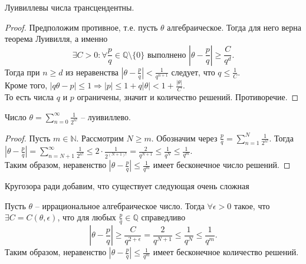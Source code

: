 \begin{proposition} \label{l9_prp}
	Луивиллевы числа трансцендентны.
\end{proposition}
\begin{proof}
	Предположим противное, т.е. пусть $\theta$ алгебраическое. Тогда для него верна теорема Луивилля, а именно
	$$\exists C > 0:  \forall  \frac{p}{q} \in \mathbb{Q} \setminus \lbrace 0 \rbrace \text{ выполнено }  \left|\theta - \frac{p}{q}\right| \geq \frac{C}{q^d}.$$ 
	Тогда при $n \geq d$ из неравенства $\displaystyle \left|\theta - \frac{p}{q}\right| < \frac{1}{q^{n + 1}}$ следует, что $\displaystyle q \leq \frac{1}{C}$.\\
	Кроме того, $\displaystyle \left|q \theta - p\right| \leq 1 \Rightarrow |p| \leq 1 + q|\theta| < 1 + \frac{|\theta|}{C}.$\\
	То есть числа $q$ и $p$ ограничены, значит и количество решений. Противоречие.
\end{proof}

\begin{example}
	Число $\displaystyle \theta = \sum_{n = 0}^{\infty} \frac{1}{2^{n!}}$ -- луивиллево.
\end{example}
\begin{proof}
	Пусть $m \in \mathbb{N}$. Рассмотрим $N \geq m$. Обозначим через $\displaystyle \frac{p}{q} = \sum_{n = 1}^{N} \frac{1}{2^{n!}}$. Тогда $\displaystyle \left| \theta - \frac{p}{q} \right| = \sum_{n = N + 1}^{\infty} \frac{1}{2^{n!}} \leq 2 \cdot \frac{1}{2^{(N+1)!}} = \frac{2}{q^{N + 1}} \leq \frac{1}{q^N} \leq \frac{1}{q^m}$.\\
	Таким образом, неравенство $\displaystyle \left| \theta - \frac{p}{q} \right| \leq \frac{1}{q^m}$ имеет бесконечное число решений.
\end{proof}

Кругозора ради добавим, что существует следующая очень сложная

\begin{theorem}
	Пусть $\theta$ -- иррациональное алгебраическое число. Тогда $\forall \epsilon > 0$ такое, что $\exists C = C(\theta, \epsilon)$, что для любых $\frac{p}{q} \in \mathbb{Q}$ справедливо 
	$$\left|\theta - \frac{p}{q}\right| \geq \frac{C}{q^{2 + \epsilon}} = \frac{2}{q^{N+1}} \leq \frac{1}{q^N} \leq \frac{1}{q^m}.$$
	Таким образом, неравенство $\displaystyle \left|\theta - \frac{p}{q}\right| \leq \frac{1}{q^m}$ имеет бесконечное количество решений.
\end{theorem}~\\

